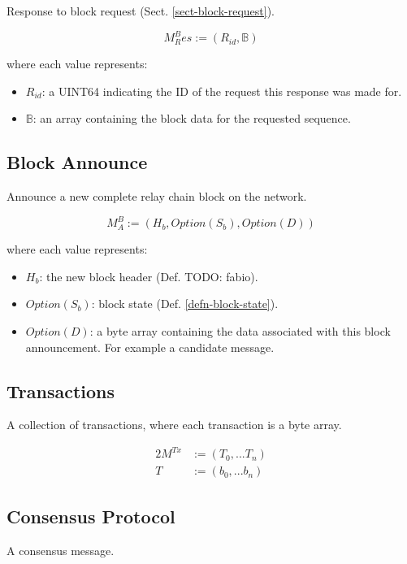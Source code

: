 \documentclass{book}
\newcommand{\todo}[1]{}
\renewcommand{\todo}[1]{{\color{red} TODO: {#1}}}
\begin{document}
Response to block request (Sect. \ref{sect-block-request}).

\[
    M^B_Res := (R_{id}, \mathbb{B})
\]

where each value represents:

\begin{itemize}
    \item $R_{id}$: a UINT64 indicating the ID of the request this response was
    made for.
    \item $\mathbb{B}$: an array containing the block data for the requested
    sequence.
\end{itemize}

\subsection{Block Announce}

Announce a new complete relay chain block on the network.

\[
    M^B_A := (H_b, Option(S_b), Option(D))
\]

where each value represents:

\begin{itemize}
    \item $H_b$: the new block header (Def. \todo{fabio}).
    \item $Option(S_b)$: block state (Def. \ref{defn-block-state}).
    \item $Option(D)$: a byte array containing the data associated with this
    block announcement. For example a candidate message.
\end{itemize}

\subsection{Transactions}

A collection of transactions, where each transaction is a byte array.

\begin{alignat*}{2}
    M^{Tx} &:= (T_0, ... T_n) \\
    T &:= (b_0, ... b_n)
\end{alignat*}

\subsection{Consensus Protocol}\label{sect-consensus-protocol}

A consensus message.
\end{document}
